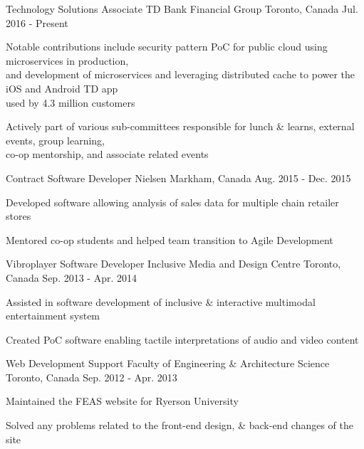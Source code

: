 \begin{cventries}
  \cventry
    {Technology Solutions Associate}
    {TD Bank Financial Group}
    {Toronto, Canada}
    {Jul. 2016 - Present}
    {
      \begin{cvitems}
        \item {Notable contributions include security pattern PoC for public cloud using microservices in production, \\ and development of microservices and leveraging distributed cache to power the iOS and Android TD app \\used by 4.3 million customers}
        \item {Actively part of various sub-committees responsible for lunch \& learns, external events, group learning, \\ co-op mentorship, and associate related events}
      \end{cvitems}
    }
  \cventry
    {Contract Software Developer}
    {Nielsen}
    {Markham, Canada}
    {Aug. 2015 - Dec. 2015}
    {
      \begin{cvitems}
        \item {Developed software allowing analysis of sales data for multiple chain retailer stores}
        \item {Mentored co-op students and helped team transition to Agile Development}
      \end{cvitems}
    }
  \cventry
    {Vibroplayer Software Developer}
    {Inclusive Media and Design Centre}
    {Toronto, Canada}
    {Sep. 2013 - Apr. 2014}
    {
      \begin{cvitems}
        \item {Assisted in software development of inclusive \& interactive multimodal entertainment system}
        \item {Created PoC software enabling tactile interpretations of audio and video content}
      \end{cvitems}
    }
 \cventry
   {Web Development Support}
    {Faculty of Engineering \& Architecture Science}
    {Toronto, Canada}
    {Sep. 2012 - Apr. 2013}
    {
      \begin{cvitems}
        \item {Maintained the FEAS website for Ryerson University}
        \item {Solved any problems related to the front-end design, \& back-end changes of the site}
     \end{cvitems}
    }
\end{cventries}